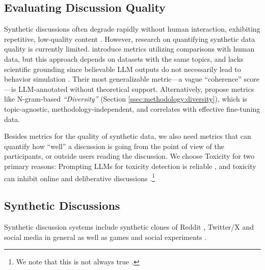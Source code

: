 \subsection{Evaluating Discussion Quality}
\label{ssec:related:quality}

Synthetic discussions often degrade rapidly without human interaction, exhibiting repetitive, low-quality content \citep{ulmer2024}. However, research on quantifying synthetic data quality is currently limited. \citet{balog_2024} introduce metrics utilizing comparisons with human data, but this approach depends on datasets with the same topics, and lacks scientific grounding since believable \ac{LLM} outputs do not necessarily lead to behavior simulation \cite{rossi_2024}. Their most generalizable metric—a vague “coherence” score—is \ac{LLM}-annotated without theoretical support. Alternatively, \citet{ulmer2024} propose metrics like N-gram-based \textit{“Diversity”} (Section \ref{ssec:methodology:diversity}), which is topic-agnostic, methodology-independent, and correlates with effective fine-tuning data.

Besides metrics for the quality of synthetic data, we also need metrics that can quantify how ``well'' a discussion is going from the point of view of the participants, or outside users reading the discussion. We choose Toxicity for two primary reasons: Prompting \acp{LLM} for toxicity detection is reliable \citep{kang-qian-2024-implanting, Wang2022ToxicityDW, anjum2024hate}, and toxicity can inhibit online and deliberative discussions \citep{dekock2022disagree, XiaToxicity}.\footnote{We note that this is not always true \citep{Avalle2024PersistentIP}.} 


\subsection{Synthetic Discussions}
\label{ssec:related:discussions}


Synthetic discussion systems 
include synthetic clones of Reddit \cite{park_simulacra}, Twitter/X \cite{mou_2024} and social media in general \cite{tornberg_2023, y_social} as well as games \cite{Park2023GenerativeAI} and social experiments \cite{zhou_2024_sotopia}.

